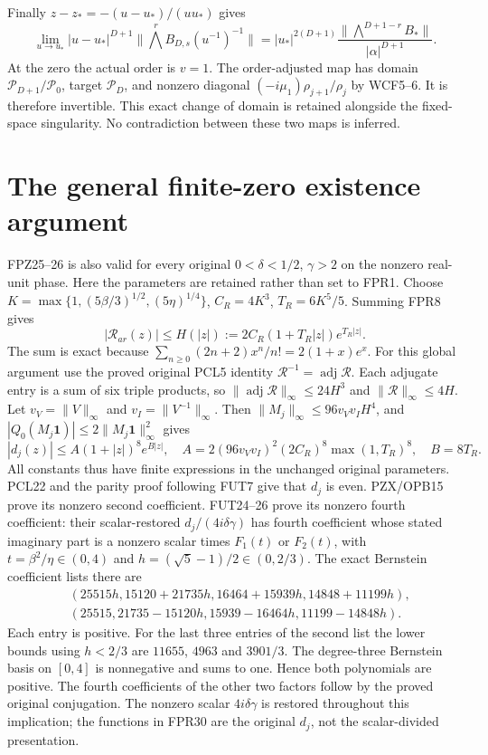 \documentclass[11pt]{article}
\begin{document}
Finally $z-z_*=-(u-u_*)/(uu_*)$ gives
\[
 \lim_{u\to u_*}|u-u_*|^{D+1}
 \|\bigwedge^r B_{D,s}(u^{-1})^{-1}\|
 =|u_*|^{2(D+1)}
   \frac{\|\bigwedge^{D+1-r}B_*\|}{|\alpha|^{D+1}}.
 \tag{FPR28}
\]
At the zero the actual order is $v=1$. The order-adjusted map
has domain $\mathcal P_{D+1}/\mathcal P_0$, target
$\mathcal P_D$, and nonzero diagonal
$(-i\mu_1)\rho_{j+1}/\rho_j$ by WCF5--6. It is therefore
invertible. This exact change of domain is retained alongside
the fixed-space singularity. No contradiction between these
two maps is inferred.

\section{The general finite-zero existence argument}
FPZ25--26 is also valid for every original
$0<\delta<1/2$, $\gamma>2$ on the nonzero real-unit phase.
Here the parameters are retained rather than set to FPR1.
Choose $K=\max\{1,(5\beta/3)^{1/2},(5\eta)^{1/4}\}$,
$C_R=4K^3$, $T_R=6K^5/5$. Summing FPR8 gives
\[
 |\mathcal R_{ar}(z)|\le
 H(|z|):=2C_R(1+T_R|z|)e^{T_R|z|}.
 \tag{FPR29}
\]
The sum is exact because
$\sum_{n\ge0}(2n+2)x^n/n!=2(1+x)e^x$.
For this global argument use the proved original PCL5 identity
$\mathcal R^{-1}=\operatorname{adj}\mathcal R$.
Each adjugate entry is a sum of six triple products, so
$\|\operatorname{adj}\mathcal R\|_\infty\le24H^3$
and $\|\mathcal R\|_\infty\le4H$.
Let $v_V=\|V\|_\infty$ and $v_I=\|V^{-1}\|_\infty$.
Then $\|M_j\|_\infty\le96v_Vv_IH^4$, and
$|Q_0(M_j\mathbf1)|\le2\|M_j\mathbf1\|_\infty^2$ gives
\[
 |d_j(z)|\le A(1+|z|)^8e^{B|z|},\quad
 A=2(96v_Vv_I)^2(2C_R)^8\max(1,T_R)^8,\quad B=8T_R.
 \tag{FPR30}
\]
All constants thus have finite expressions in the unchanged original
parameters. PCL22 and the parity proof following FUT7 give that $d_j$
is even. PZX/OPB15 prove its nonzero second coefficient.
FUT24--26 prove its nonzero fourth coefficient: their scalar-restored
$d_j/(4i\delta\gamma)$ has fourth coefficient whose stated imaginary
part is a nonzero scalar times $F_1(t)$ or $F_2(t)$, with
$t=\beta^2/\eta\in(0,4)$ and $h=(\sqrt5-1)/2\in(0,2/3)$.
The exact Bernstein coefficient lists there are
\[
 \begin{split}
 &(25515h,15120+21735h,16464+15939h,14848+11199h),\\
 &(25515,21735-15120h,15939-16464h,11199-14848h).
 \end{split}\tag{FPR31}
\]
Each entry is positive. For the last three entries of the second
list the lower bounds using $h<2/3$ are $11655$, $4963$ and
$3901/3$. The degree-three Bernstein basis on $[0,4]$ is
nonnegative and sums to one. Hence both polynomials are positive.
The fourth coefficients of the other two factors follow by the
proved original conjugation. The nonzero scalar $4i\delta\gamma$
is restored throughout this implication; the functions in FPR30
are the original $d_j$, not the scalar-divided presentation.
\end{document}
